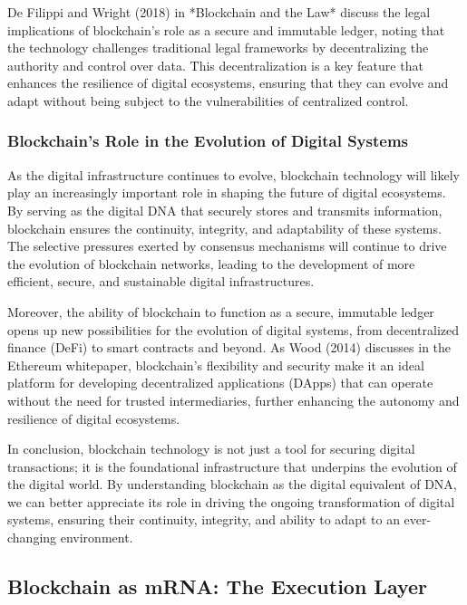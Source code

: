 \documentclass[12pt,twoside]{article}
\begin{document}
De Filippi and Wright (2018) in *Blockchain and the Law* discuss the legal implications of blockchain’s role as a secure and immutable ledger, noting that the technology challenges traditional legal frameworks by decentralizing the authority and control over data. This decentralization is a key feature that enhances the resilience of digital ecosystems, ensuring that they can evolve and adapt without being subject to the vulnerabilities of centralized control.

\subsubsection{Blockchain’s Role in the Evolution of Digital Systems}

As the digital infrastructure continues to evolve, blockchain technology will likely play an increasingly important role in shaping the future of digital ecosystems. By serving as the digital DNA that securely stores and transmits information, blockchain ensures the continuity, integrity, and adaptability of these systems. The selective pressures exerted by consensus mechanisms will continue to drive the evolution of blockchain networks, leading to the development of more efficient, secure, and sustainable digital infrastructures.

Moreover, the ability of blockchain to function as a secure, immutable ledger opens up new possibilities for the evolution of digital systems, from decentralized finance (DeFi) to smart contracts and beyond. As Wood (2014) discusses in the Ethereum whitepaper, blockchain’s flexibility and security make it an ideal platform for developing decentralized applications (DApps) that can operate without the need for trusted intermediaries, further enhancing the autonomy and resilience of digital ecosystems.

In conclusion, blockchain technology is not just a tool for securing digital transactions; it is the foundational infrastructure that underpins the evolution of the digital world. By understanding blockchain as the digital equivalent of DNA, we can better appreciate its role in driving the ongoing transformation of digital systems, ensuring their continuity, integrity, and ability to adapt to an ever-changing environment.


\subsection{Blockchain as mRNA: The Execution Layer}
\end{document}
